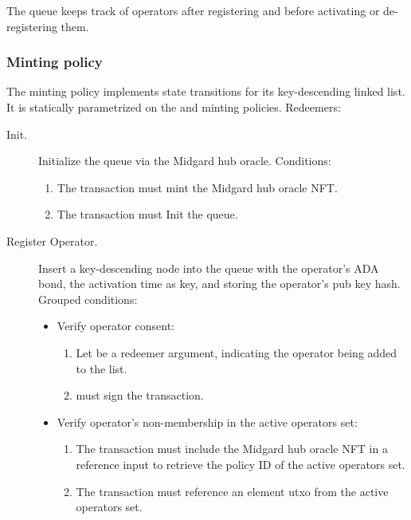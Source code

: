 \documentclass[../midgard.tex]{subfiles}
\begin{document}
The  queue keeps track of operators after registering and before activating or de-registering them.

\subsubsection{Minting policy}
\label{h:registered-operators-minting-policy}

The  minting policy implements state transitions for its key-descending linked list.
It is statically parametrized on the  and  minting policies.
Redeemers:
\begin{description}
    \item[Init.] Initialize the  queue via the Midgard hub oracle.
      Conditions:
        \begin{enumerate}
            \item The transaction must mint the Midgard hub oracle NFT.
            \item The transaction must Init the  queue.
        \end{enumerate}
    \item[Register Operator.] Insert a key-descending node into the  queue with the operator's ADA bond, the activation time as key, and storing the operator's pub key hash.
      Grouped conditions:
        \begin{itemize}
            \item Verify operator consent:
                \begin{enumerate}
                    \item Let  be a redeemer argument, indicating the operator being added to the list.
                    \item {} must sign the transaction.
                \end{enumerate}
            \item Verify operator's non-membership in the active operators set:
                \begin{enumerate}[resume]
                    \item The transaction must include the Midgard hub oracle NFT in a reference input to retrieve the policy ID of the active operators set.
                    \item The transaction must reference an element utxo from the active operators set.

\end{enumerate}
\end{itemize}
\end{description}
\end{document}
